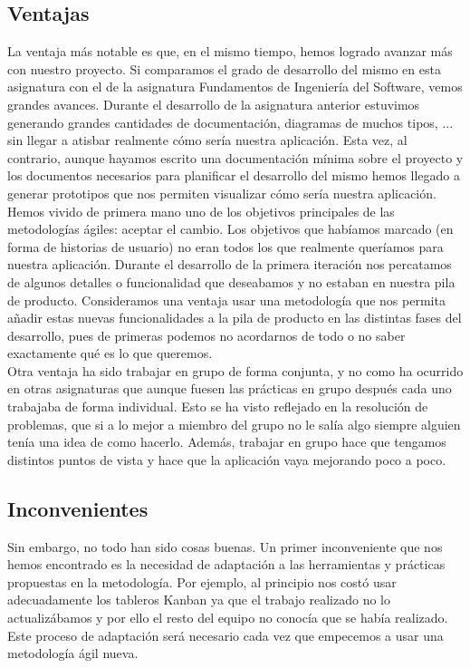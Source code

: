 \documentclass[11pt]{article}
\begin{document}
\subsection*{Ventajas}
La ventaja más notable es que, en el mismo tiempo, hemos logrado avanzar más con nuestro proyecto. Si comparamos el grado de desarrollo del mismo en esta asignatura con el de la asignatura Fundamentos de Ingeniería del Software, vemos grandes avances. Durante el desarrollo de la asignatura anterior estuvimos generando grandes cantidades de documentación, diagramas de muchos tipos, ... sin llegar a atisbar realmente cómo sería nuestra aplicación. Esta vez, al contrario, aunque hayamos escrito una documentación mínima sobre el proyecto y los documentos necesarios para planificar el desarrollo del mismo hemos llegado a generar prototipos que nos permiten visualizar cómo sería nuestra aplicación.\\

Hemos vivido de primera mano uno de los objetivos principales de las metodologías ágiles: aceptar el cambio. Los objetivos que habíamos marcado (en forma de historias de usuario) no eran todos los que realmente queríamos para nuestra aplicación. Durante el desarrollo de la primera iteración nos percatamos de algunos detalles o funcionalidad que deseabamos y no estaban en nuestra pila de producto. Consideramos una ventaja usar una metodología que nos permita añadir estas nuevas funcionalidades a la pila de producto en las distintas fases del desarrollo, pues de primeras podemos no acordarnos de todo o no saber exactamente qué es lo que queremos.\\

Otra ventaja ha sido trabajar en grupo de forma conjunta, y no como ha ocurrido en otras asignaturas que aunque fuesen las prácticas en grupo después cada uno trabajaba de forma individual. Esto se ha visto reflejado en la resolución de problemas, que si a lo mejor a miembro del grupo no le salía algo siempre alguien tenía una idea de como hacerlo. Además, trabajar en grupo hace que tengamos distintos puntos de vista y hace que la aplicación vaya mejorando poco a poco.

\subsection*{Inconvenientes}

Sin embargo, no todo han sido cosas buenas. Un primer inconveniente que nos hemos encontrado es la necesidad de adaptación a las herramientas y prácticas propuestas en la metodología. Por ejemplo, al principio nos costó usar adecuadamente los tableros Kanban ya que el trabajo realizado no lo actualizábamos y por ello el resto del equipo no conocía que se había realizado. Este proceso de adaptación será necesario cada vez que empecemos a usar una metodología ágil nueva. \\
\end{document}
